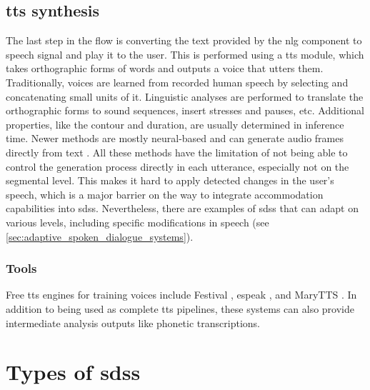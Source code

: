 
\subsection{\Acl{tts} synthesis}
\label{subsec:text-to-speech_synthesis}

The last step in the flow is converting the text provided by the \ac{nlg} component to speech signal and play it to the user.
This is performed using a \acf{tts} module, which takes orthographic forms of words and outputs a voice that utters them.
Traditionally, voices are learned from recorded human speech by selecting and concatenating small units of it.
Linguistic analyses are performed to translate the orthographic forms to sound sequences, insert stresses and pauses, etc.
Additional properties, like the contour and duration, are usually determined in inference time.
Newer methods are mostly neural-based and can generate audio frames directly from text \citep[e.g.,][]{Shen2018natural}.
All these methods have the limitation of not being able to control the generation process directly in each utterance, especially not on the segmental level.
This makes it hard to apply detected changes in the user's speech, which is a major barrier on the way to integrate accommodation capabilities into \acp{sds}.
Nevertheless, there are examples of \acp{sds} that can adapt on various levels, including specific modifications in speech (see \cref{sec:adaptive_spoken_dialogue_systems}).

\subsubsection{Tools}
\label{subsubsec:tools_tts}

Free \ac{tts} engines for training voices include Festival \citep{Black1997festival}, espeak \citep{Duddington2012espeak}, and MaryTTS \citep{Schroder2011open}.
In addition to being used as complete \ac{tts} pipelines, these systems can also provide intermediate analysis outputs like phonetic transcriptions.

\section{Types of \aclp{sds}}
\label{sec:types_of_sdss}

